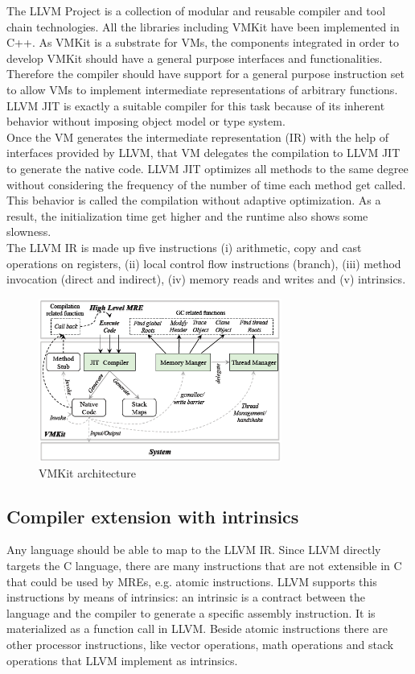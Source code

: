 The LLVM Project is a collection of modular and reusable compiler and tool chain technologies. All the libraries including VMKit have been implemented in C++. As VMKit is a substrate for VMs, the components integrated in order to develop VMKit should have a general purpose interfaces and functionalities. Therefore the compiler should have support for a general purpose instruction set to allow VMs to implement intermediate representations of arbitrary functions. LLVM JIT is exactly a suitable compiler for this task because of its inherent behavior without  imposing object model or type system.\\
Once the VM generates the intermediate representation (IR) with the help of interfaces provided by LLVM, that VM delegates the compilation to LLVM JIT to generate the native code. LLVM JIT optimizes all methods to the same degree without considering the frequency of the number of time each method get called. This behavior is called the compilation without adaptive optimization. As a result, the initialization time get higher and the runtime also shows some slowness.\\
The LLVM IR is made up five instructions (i) arithmetic, copy and cast operations on registers, (ii) local control flow instructions (branch), (iii) method invocation (direct and indirect), (iv) memory reads and writes and (v) intrinsics.\\

\begin{figure}[ht!]
\centering
\includegraphics[width=80mm]{vmkit.png}
\caption{VMKit architecture}
\label{fig:vmkitimplementation}
\end{figure}

\subsection{Compiler extension with  intrinsics}
Any language should be able to map to the LLVM IR. Since LLVM directly targets the C language, there are many instructions that are not extensible in C that could be used by MREs, e.g. atomic instructions. LLVM supports this instructions by means of intrinsics: an intrinsic is a contract between the language and the compiler to generate a specific assembly instruction. It is materialized as a function call in LLVM. Beside atomic instructions there are other processor instructions, like vector operations, math operations and stack operations that LLVM implement as intrinsics.

